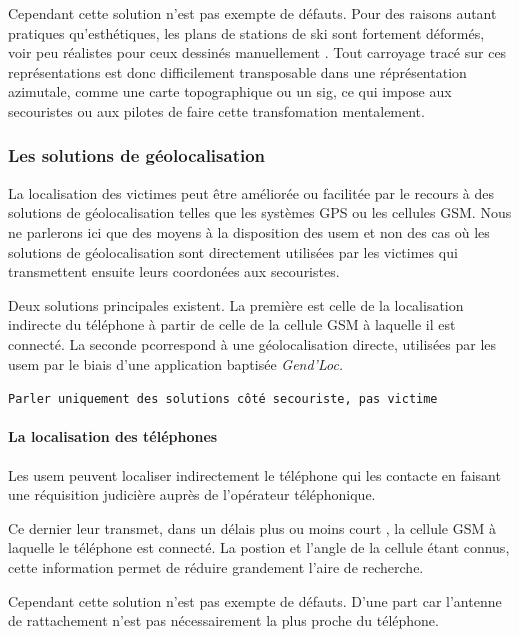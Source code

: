 Cependant cette solution n'est pas exempte de défauts. Pour des
raisons autant pratiques qu’esthétiques, les plans de stations de ski
sont fortement déformés, voir peu réalistes pour ceux dessinés
manuellement \autocite{Gauchon2014,LaPorte2017}. Tout carroyage tracé
sur ces représentations est donc difficilement transposable dans une
réprésentation azimutale, comme une carte topographique ou un
\ac{sig}, ce qui impose aux secouristes ou aux pilotes de faire cette
transfomation mentalement.

\subsubsection{Les solutions de géolocalisation}
\label{subsec:1-1-2-2}

La localisation des victimes peut être améliorée ou facilitée par le
recours à des solutions de géolocalisation telles que les systèmes
GPS ou les cellules GSM. Nous ne parlerons ici que des moyens à la
disposition des \ac{usem} et non des cas où les solutions de
géolocalisation sont directement utilisées par les victimes qui
transmettent ensuite leurs coordonées aux secouristes.

Deux solutions principales existent. La première est celle de la
localisation indirecte du téléphone à partir de celle de la cellule
GSM à laquelle il est connecté. La seconde pcorrespond à une
géolocalisation directe, utilisées par les \ac{usem} par le biais
d'une application baptisée \emph{Gend'Loc.}

\texttt{Parler uniquement des solutions côté secouriste, pas victime}

\paragraph{La localisation des téléphones}


Les \ac{usem} peuvent localiser indirectement le téléphone qui les
contacte en faisant une réquisition judicière auprès de l'opérateur
téléphonique.

Ce dernier leur transmet, dans un délais plus ou moins court
, la cellule GSM à laquelle le téléphone est connecté. La
postion et l'angle de la cellule étant connus, cette information
permet de réduire grandement l'aire de recherche.

Cependant cette solution n'est pas exempte de défauts. D'une part car
l'antenne de rattachement n'est pas nécessairement la plus proche du
téléphone.

